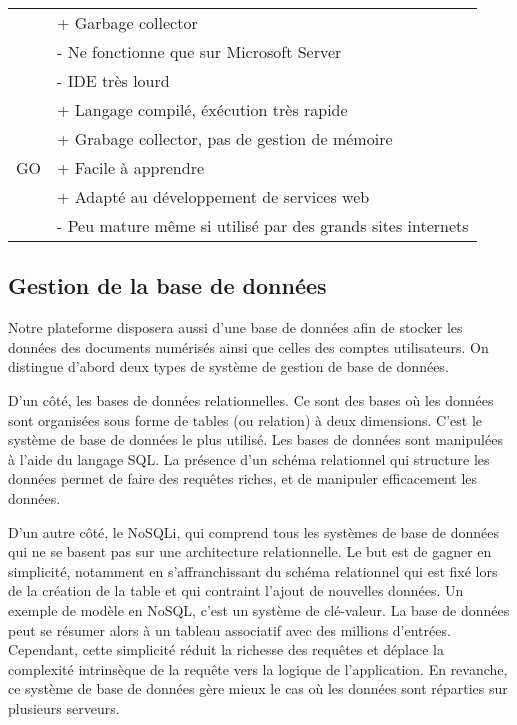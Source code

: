 \begin{tabular}{|l|l|}
                & + Garbage collector \\
                & - Ne fonctionne que sur Microsoft Server \\
                & - IDE très lourd \\ \hline
            \multirow{5}{*}{GO} & + Langage compilé, éxécution  très rapide \\
                & + Grabage collector, pas de gestion de mémoire \\
                & + Facile à apprendre \\
                & + Adapté au développement de services web \\
                & - Peu mature même si utilisé par des grands sites internets \\
            \hline
        \end{tabular}

    \subsection{Gestion de la base de données}
    \label{subsec:bdd}

   Notre plateforme disposera aussi d’une base de données afin de stocker les données des documents numérisés ainsi
   que celles des comptes utilisateurs. On distingue d’abord deux types de système de gestion de base de données.

   D’un côté, les bases de données relationnelles. Ce sont des bases où les données sont organisées sous forme
   de tables (ou relation) à deux dimensions. C’est le système de base de données le plus utilisé. Les bases
   de données sont manipulées à l’aide du langage SQL. La présence d’un schéma relationnel qui structure les données
   permet de faire des requêtes riches, et de manipuler efficacement les données.

   D’un autre côté, le NoSQLi, qui comprend tous les systèmes de base de données qui ne se basent pas sur
   une architecture relationnelle. Le but est de gagner en simplicité, notamment en s’affranchissant
   du schéma relationnel qui est fixé lors de la création de la table et qui contraint l’ajout de nouvelles données.
   Un exemple de modèle en NoSQL, c’est un système de clé-valeur. La base de données peut se résumer alors
   à un tableau associatif avec des millions d’entrées. Cependant, cette simplicité réduit la richesse des requêtes
   et déplace la complexité intrinsèque de la requête vers la logique de l’application. En revanche, ce système de base
   de données gère mieux le cas où les données sont réparties sur plusieurs serveurs.


